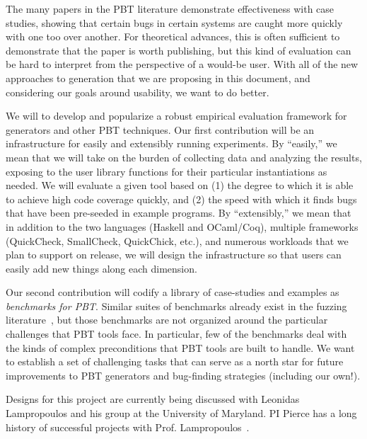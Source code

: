 %
\iflater{}\fi

\iflater{}\fi
%
The many papers in the PBT literature demonstrate effectiveness with case
studies, showing that certain bugs in certain systems are caught more quickly
with one too over another. For theoretical advances, this is often sufficient
to demonstrate that the paper is worth publishing, but this kind of evaluation
can be hard to interpret from the perspective of a would-be user. With all of
the new approaches to generation that we are proposing in this document, and
considering our goals around usability, we want to do better.

We will to develop and popularize a robust empirical evaluation framework for
generators and other PBT techniques. Our first contribution will be an
infrastructure for easily and extensibly running experiments.  By ``easily,'' we
mean that we will take on the burden of collecting data and analyzing the
results, exposing to the user library functions for their particular
instantiations as needed. We will evaluate a given tool based on (1) the degree
to which it is able to achieve high code coverage quickly, and (2) the speed
with which it finds bugs that have been pre-seeded in example programs. By
``extensibly,'' we mean that in addition to the two languages (Haskell and
OCaml/Coq), multiple frameworks (QuickCheck, SmallCheck, QuickChick, etc.), and
numerous workloads that we plan to support on release, we will design the
infrastructure so that users can easily add new things along each dimension.

Our second contribution will codify a library of case-studies and examples as
{\em benchmarks for PBT}. Similar suites of benchmarks already exist in the
fuzzing literature~\cite{hazimeh_magma_2021}, but those benchmarks are not
organized around the particular challenges that PBT tools face. In particular,
few of the benchmarks deal with the kinds of complex preconditions that PBT
tools are built to handle. We want to establish a set of challenging tasks that
can serve as a north star for future improvements to PBT generators and
bug-finding strategies (including our own!).

Designs for this project are currently being discussed with Leonidas
Lampropoulos and his group at the University of Maryland. PI Pierce has a long
history of successful projects with Prof.
Lampropoulos~\cite[etc.]{LuckPOPL,goldstein2021dojudgeatest,lampropoulos_coverage_2019,Lampropoulos&18,OLDlampropoulos19fuzzchick}.

